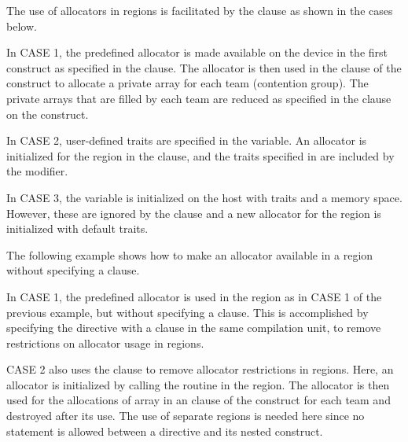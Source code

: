 
The use of allocators in  regions is facilitated by the
 clause as shown in the cases below.

In CASE 1, the predefined  allocator is made available on the
device in the first  construct as specified in the  clause.
The allocator is then used in the 
clause of the  construct to allocate a private array for each
team (contention group). The private  arrays that are filled by each
team are reduced as specified in the  clause on the  construct.

In CASE 2, user-defined traits are specified in the  variable.
An allocator is initialized for the  region in the  clause,
and the traits specified in  are included by the  modifier.

In CASE 3, the  variable is initialized on the host with traits
and a memory space. However, these are ignored by the  clause
and a new allocator for the  region is initialized with default traits.



The following example shows how to make an allocator available in a  region 
without specifying a  clause.

In CASE 1, the predefined  allocator is used in the 
region as in CASE 1 of the previous example, but without specifying a  clause.
This is accomplished by specifying the  directive with a
 clause in the same compilation unit, to remove
restrictions on allocator usage in  regions.

CASE 2 also uses the  clause to remove allocator
restrictions in  regions. Here, an allocator is initialized
by calling the  routine in the  region.
The allocator is then used for the allocations of array  in 
an  clause of the  construct 
for each team and destroyed after its use.
The use of separate  regions is needed here since
no statement is allowed between a  directive and 
its nested  construct.

